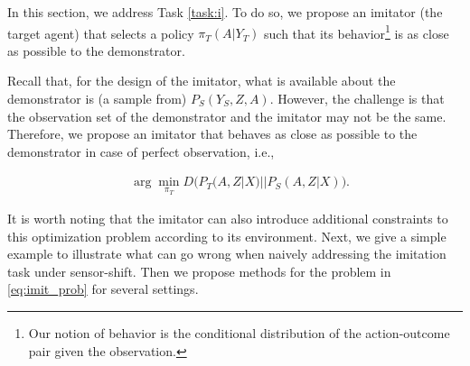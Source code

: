 \documentclass[letterpaper]{article} %
\theoremstyle{definition}%
\theoremstyle{definition}
\newcommand{\repl}[2]{\st{#1}\textcolor{red}{#2}}
\newcommand{\dob}[1]{do(#1)}
\newcommand{\Obs}{Y}
\newcommand{\obs}{y}
\newcommand{\Out}{Z}
\begin{document}
%
%



In this section, we address Task \ref{task:i}. To do so, we propose an imitator (the target agent) that selects a policy $\pi_T(A|\Obs_T)$ such that its behavior\footnote{Our notion of behavior is the conditional distribution of the action-outcome pair given the observation.} is as close as possible to the demonstrator.

Recall that, for the design of the imitator, what is available about the demonstrator is (a sample from) $P_S(\Obs_S, \Out, A)$.
However, the challenge is that the observation set of the demonstrator and the imitator may not be the same.
Therefore, we propose an imitator that behaves as close as possible to the demonstrator in case of perfect observation, i.e.,
 
\begin{align}\label{eq:imit_prob}
&\arg\min_{\pi_T}D\Big(P_T(A, \Out|X)||P_S(A, \Out|X)\Big).
\end{align}

It is worth noting that the imitator can also introduce additional constraints to this optimization problem according to its environment. 
Next, we give a simple example to illustrate what can go wrong when naively addressing the imitation task under sensor-shift. 
Then we propose methods for the problem in \eqref{eq:imit_prob} for several settings.
\end{document}
